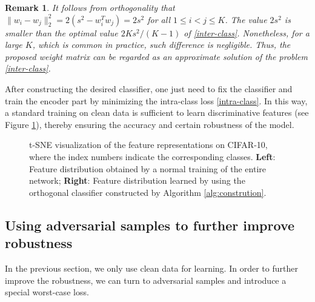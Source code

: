 \documentclass[preprint,review,12pt]{elsarticle}
\newtheorem{rmrk}{Remark}
\numberwithin{equation}{section}
\begin{document}
\begin{rmrk}
        It follows from orthogonality that  $ \|w_i - w_j\|_2^2 = 2 (s^2 - w_i^Tw_j)= 2s^2 $ for all  $ 1\leq i < j \leq K $.
		The value $ 2s^2 $ is smaller than the optimal value  $ 2K s^2/(K-1) $ of  \eqref{inter-class}.
        Nonetheless,  for a large $ K $, which is common in practice, such difference is negligible.
		Thus, the proposed weight matrix can be regarded as an approximate solution of the problem \eqref{inter-class}.
\end{rmrk}
	
After constructing the desired classifier,	
one just need to fix the classifier and train the encoder part by minimizing the intra-class loss \eqref{intra-class}.
In this way, a standard training on clean data is sufficient to learn discriminative features (see Figure \ref{features}),
thereby ensuring the accuracy and certain robustness of the model.

	\begin{figure}[!htb]
		\centering
		\begin{minipage}{0.45\textwidth}
			\centering
		\end{minipage}
		\begin{minipage}{0.45\textwidth}
			\centering
		\end{minipage}
		\caption{t-SNE \cite{maaten2008} visualization of the feature representations on CIFAR-10, where the index numbers indicate the corresponding classes.
			\textbf{Left}:   Feature distribution obtained by a normal training of the entire network;
			\textbf{Right}: Feature distribution learned by using the orthogonal classifier constructed by Algorithm \ref{alg:constrution}.}
		\label{features}
	\end{figure}



\subsection{Using adversarial samples to further improve robustness}
In the previous section,
we only use clean data for learning.
In order to further improve the robustness,
we can turn to adversarial samples  \cite{madry2018,zhang2019b} and introduce  a special worst-case loss.
\end{document}
